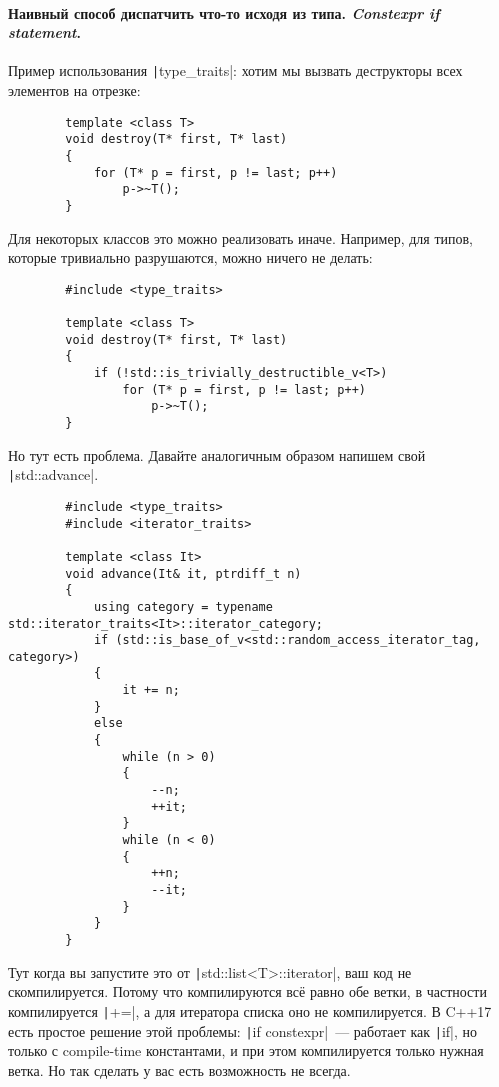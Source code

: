 \documentclass{article}
\begin{document}
    \paragraph{Наивный способ диспатчить что-то исходя из типа. \textit{Constexpr if statement}.}
    Пример использования \texttt|type_traits|: хотим мы вызвать деструкторы всех элементов на отрезке:
    \begin{verbatim}
        template <class T>
        void destroy(T* first, T* last)
        {
            for (T* p = first, p != last; p++)
                p->~T();
        }
    \end{verbatim}
    Для некоторых классов это можно реализовать иначе. Например, для типов, которые тривиально разрушаются, можно ничего не делать:
    \begin{verbatim}
        #include <type_traits>
        
        template <class T>
        void destroy(T* first, T* last)
        {
            if (!std::is_trivially_destructible_v<T>)
                for (T* p = first, p != last; p++)
                    p->~T();
        }
    \end{verbatim}
    Но тут есть проблема. Давайте аналогичным образом напишем свой \texttt|std::advance|.
    \begin{verbatim}
        #include <type_traits>
        #include <iterator_traits>

        template <class It>
        void advance(It& it, ptrdiff_t n)
        {
            using category = typename std::iterator_traits<It>::iterator_category;
            if (std::is_base_of_v<std::random_access_iterator_tag, category>)
            {
                it += n;
            }
            else
            {
                while (n > 0)
                {
                    --n;
                    ++it;
                }
                while (n < 0)
                {
                    ++n;
                    --it;
                }
            }
        }
    \end{verbatim}
    Тут когда вы запустите это от \texttt|std::list<T>::iterator|, ваш код не скомпилируется. Потому что компилируются всё равно обе ветки, в частности компилируется \texttt|+=|, а для итератора списка оно не компилируется. В C++17 есть простое решение этой проблемы: \texttt|if constexpr|~--- работает как \texttt|if|, но только с compile-time константами, и при этом компилируется только нужная ветка. Но так сделать у вас есть возможность не всегда.
\end{document}
